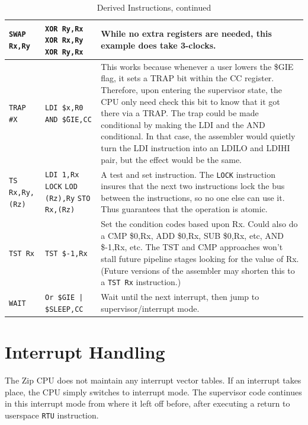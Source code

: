 \documentclass{gqtekspec}
\begin{document}
\begin{table}\begin{center}
\begin{tabular}{p{1.4in}p{1.5in}p{3in}}\\\hline
{\tt SWAP Rx,Ry }
	& \parbox[t]{1.5in}{\tt XOR Ry,Rx \\ XOR Rx,Ry \\ XOR Ry,Rx} 
	& While no extra registers are needed, this example
	does take 3-clocks. \\\hline
{\tt TRAP \#X}
	& \parbox[t]{1.5in}{\tt LDI \$x,R0 \\ AND \~\$GIE,CC }
	& This works because whenever a user lowers the \$GIE flag, it sets
	a TRAP bit within the CC register.  Therefore, upon entering the 
	supervisor state, the CPU only need check this bit to know that it
	got there via a TRAP.  The trap could be made conditional by making
	the LDI and the AND conditional.  In that case, the assembler would
	quietly turn the LDI instruction into an LDILO and LDIHI pair,
	but the effect would be the same. \\\hline
{\tt TS Rx,Ry,(Rz)}
	& \hbox{\tt LDI 1,Rx}
		\hbox{\tt LOCK}
		\hbox{\tt LOD (Rz),Ry}
		\hbox{\tt STO Rx,(Rz)}
	& A test and set instruction.  The {\tt LOCK} instruction insures
	that the next two instructions lock the bus between the instructions,
	so no one else can use it.  Thus guarantees that the operation is
	atomic.
	\\\hline
{\tt TST Rx}
	& {\tt TST \$-1,Rx}
	& Set the condition codes based upon Rx.  Could also do a CMP \$0,Rx,
	ADD \$0,Rx, SUB \$0,Rx, etc, AND \$-1,Rx, etc.  The TST and CMP 
	approaches won't stall future pipeline stages looking for the value
	of Rx. (Future versions of the assembler may shorten this to a 
	{\tt TST Rx} instruction.)\\\hline
{\tt WAIT}
	& {\tt Or \$GIE | \$SLEEP,CC}
	& Wait until the next interrupt, then jump to supervisor/interrupt
	mode.
\end{tabular}
\caption{Derived Instructions, continued}\label{tbl:derived-4}
\end{center}\end{table}

\section{Interrupt Handling}
The Zip CPU does not maintain any interrupt vector tables.  If an interrupt
takes place, the CPU simply switches to interrupt mode.  The supervisor code
continues in this interrupt mode from where it left off before, after 
executing a return to userspace {\tt RTU} instruction.
\end{document}
